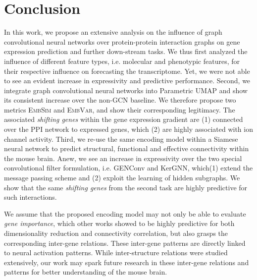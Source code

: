 \documentclass[]{article}
\begin{document}
\newpage
\section{Conclusion}
\label{sec:conclusion}
In this work, we propose an extensive analysis on the influence of graph convolutional neural networks over protein-protein interaction graphs on gene expression prediction and further down-stream tasks. We thus first analyzed the influence of different feature types, i.e. molecular and phenotypic features, for their respective influence on forecasting the transcriptome. Yet, we were not able to see an evident increase in expressivity and predictive performance. 
Second, we integrate graph convolutional neural networks into Parametric UMAP and show its consistent increase over the non-GCN baseline. We therefore propose two metrics \textsc{EmbSim} and \textsc{EmbVar}, and show their corresponding legitimacy. The associated \textit{shifting genes}
within the gene expression gradient are (1) connected over the PPI network to expressed genes, which (2) are highly associated with ion channel activity.
Third, we re-use the same encoding model within a Siamese neural network to predict structural, functional and effective connectivity within the mouse brain. Anew, we see an increase in expressivity over the two special convolutional filter formulation, i.e. GENConv and KerGNN, which(1) extend the message passing scheme and (2) exploit the learning of hidden subgraphs. We show that the same \textit{shifting genes} from the second task are highly predictive for such interactions. 

We assume that the proposed encoding model may not only be able to evaluate \textit{gene importance}, which other works showed to be highly predictive for both dimensionality reduction and connectivity correlation, but also grasps the corresponding inter-gene relations. These inter-gene patterns are directly linked to neural activation patterns. While inter-structure relations were studied extensively, our work may spark future research in these inter-gene relations and patterns for better understanding of the mouse brain. \\
\end{document}
